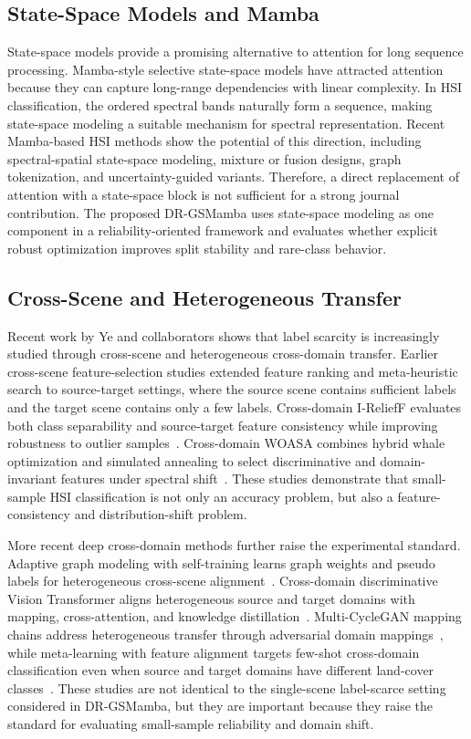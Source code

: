 \subsection{State-Space Models and Mamba}
State-space models provide a promising alternative to attention for long sequence processing. Mamba-style selective state-space models have attracted attention because they can capture long-range dependencies with linear complexity. In HSI classification, the ordered spectral bands naturally form a sequence, making state-space modeling a suitable mechanism for spectral representation. Recent Mamba-based HSI methods show the potential of this direction, including spectral-spatial state-space modeling, mixture or fusion designs, graph tokenization, and uncertainty-guided variants. Therefore, a direct replacement of attention with a state-space block is not sufficient for a strong journal contribution. The proposed DR-GSMamba uses state-space modeling as one component in a reliability-oriented framework and evaluates whether explicit robust optimization improves split stability and rare-class behavior.

\subsection{Cross-Scene and Heterogeneous Transfer}
Recent work by Ye and collaborators shows that label scarcity is increasingly studied through cross-scene and heterogeneous cross-domain transfer. Earlier cross-scene feature-selection studies extended feature ranking and meta-heuristic search to source-target settings, where the source scene contains sufficient labels and the target scene contains only a few labels. Cross-domain I-ReliefF evaluates both class separability and source-target feature consistency while improving robustness to outlier samples~\cite{zhang2021cdirf}. Cross-domain WOASA combines hybrid whale optimization and simulated annealing to select discriminative and domain-invariant features under spectral shift~\cite{wang2021cdwoasa}. These studies demonstrate that small-sample HSI classification is not only an accuracy problem, but also a feature-consistency and distribution-shift problem.

More recent deep cross-domain methods further raise the experimental standard. Adaptive graph modeling with self-training learns graph weights and pseudo labels for heterogeneous cross-scene alignment~\cite{ye2024agmst}. Cross-domain discriminative Vision Transformer aligns heterogeneous source and target domains with mapping, cross-attention, and knowledge distillation~\cite{ye2024cddvit}. Multi-CycleGAN mapping chains address heterogeneous transfer through adversarial domain mappings~\cite{ye2024multicyclegan}, while meta-learning with feature alignment targets few-shot cross-domain classification even when source and target domains have different land-cover classes~\cite{ye2026cdmfa}. These studies are not identical to the single-scene label-scarce setting considered in DR-GSMamba, but they are important because they raise the standard for evaluating small-sample reliability and domain shift.


